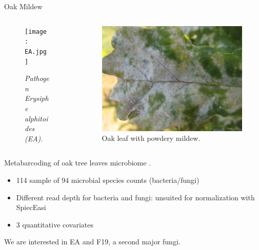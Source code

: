 \documentclass[aspectratio=169]{beamer}
\begin{document}
\begin{frame}{Oak Mildew}
\begin{columns}
\begin{column}{5cm}
\begin{figure}[htp]
\centering
\texttt{[image: EA.jpg]}
\caption{\textit{Pathogen Erysiphe alphitoides (EA).}}
\end{figure}
\end{column}
\begin{column}{6cm}
\begin{figure}[htp]
\centering
\includegraphics[scale=0.1]{mildew.jpg}
\caption{Oak leaf with powdery mildew.}
\end{figure}
\end{column}
\end{columns}
\vspace{0.5cm}
Metabarcoding of oak tree leaves microbiome \cite{jakuch}.\\

\begin{itemize}
	\item 114 sample of 94 microbial species counts (bacteria/fungi)
	\item Different read depth for bacteria and fungi: unsuited for normalization with SpiecEasi
	\item 3 quantitative covariates 
\end{itemize}\bigskip
We are interested in EA and F19, a second major fungi.
\end{frame}
\end{document}
